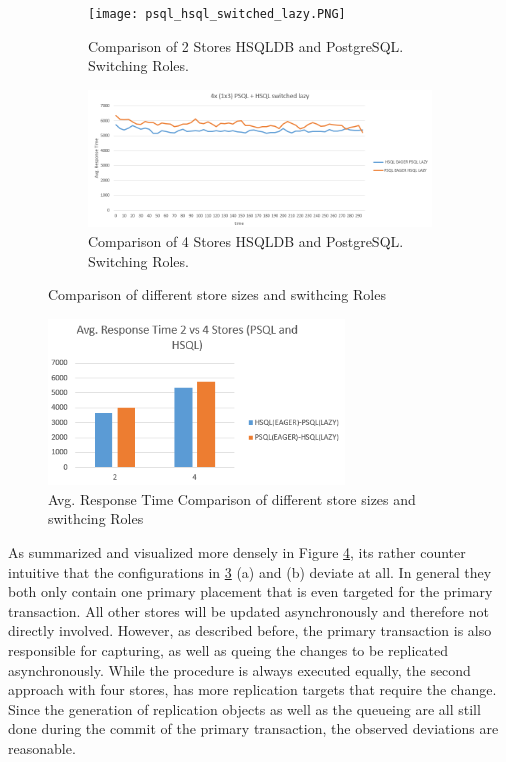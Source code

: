 \begin{figure}[t]
    \centering
    \begin{subfigure}{.5\textwidth}
      \centering
      \texttt{[image: psql\_hsql\_switched\_lazy.PNG]}
      \caption{Comparison of 2 Stores HSQLDB and PostgreSQL. Switching Roles.}
      \label{fig:2store}
    \end{subfigure}%
    \begin{subfigure}{.5\textwidth}
      \centering
      \includegraphics[width=.9\linewidth]{Figures/4psql_hsql_switched_lazy.PNG}
      \caption{Comparison of 4 Stores HSQLDB and PostgreSQL. Switching Roles.}
      \label{fig:4store}
    \end{subfigure}
    \caption{Comparison of different store sizes and swithcing Roles}
    \label{fig:24storecomp}
\end{figure}


\begin{figure}[t] 
    \centering 
    \includegraphics[width=0.7\textwidth]{Figures/24_avg_psql_hsql_switched_lazy.PNG}
    \caption{Avg. Response Time Comparison of different store sizes and swithcing Roles}
    \label{fig:24storecomp_avg}
\end{figure}


As summarized and visualized more densely in Figure \ref{fig:24storecomp_avg},
its rather counter intuitive that the configurations in \ref{fig:24storecomp} (a) and (b) deviate at all. 
In general they both only contain one primary placement that is even targeted for the primary transaction.
All other stores will be updated asynchronously and therefore not directly involved.
However, as described before, the primary transaction is also responsible for capturing, as well as queing the changes to be replicated asynchronously.
While the procedure is always executed equally, the second approach with four stores, has more replication targets that require the change. 
Since the generation of replication objects as well as the queueing are all still done during the commit of the primary transaction, the observed
deviations are reasonable.\\



